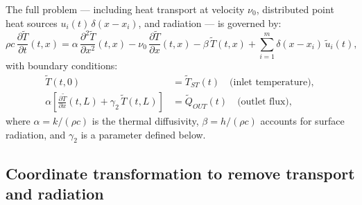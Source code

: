 The full problem --- including heat transport at velocity $\nu_{0}$,
distributed point heat sources $u_{i}(t)\,\delta(x-x_{i})$, and radiation ---
is governed by:
\begin{equation}
  \rho c\,\frac{\partial\tilde{T}}{\partial t}(t,x)
  = \alpha\,\frac{\partial^{2}\tilde{T}}{\partial x^{2}}(t,x)
  - \nu_{0}\,\frac{\partial\tilde{T}}{\partial x}(t,x)
  - \beta\,\tilde{T}(t,x)
  + \sum_{i=1}^{m}\delta(x - x_{i})\,\tilde{u}_{i}(t),
  \label{eq:heat_full}
\end{equation}
with boundary conditions:
\begin{align}
  \tilde{T}(t,0) &= \tilde{T}_{ST}(t)
    \quad\text{(inlet temperature)},\\[4pt]
  \alpha\!\left[\frac{\partial\tilde{T}}{\partial x}(t,L)
    + \gamma_{2}\,\tilde{T}(t,L)\right]
    &= \tilde{Q}_{OUT}(t)
    \quad\text{(outlet flux)},
\end{align}
where $\alpha = k/(\rho c)$ is the thermal diffusivity, $\beta = h/(\rho c)$
accounts for surface radiation, and $\gamma_{2}$ is a parameter defined below.


\subsection{Coordinate transformation to remove transport and radiation}
\label{ssec:heat_transform}

